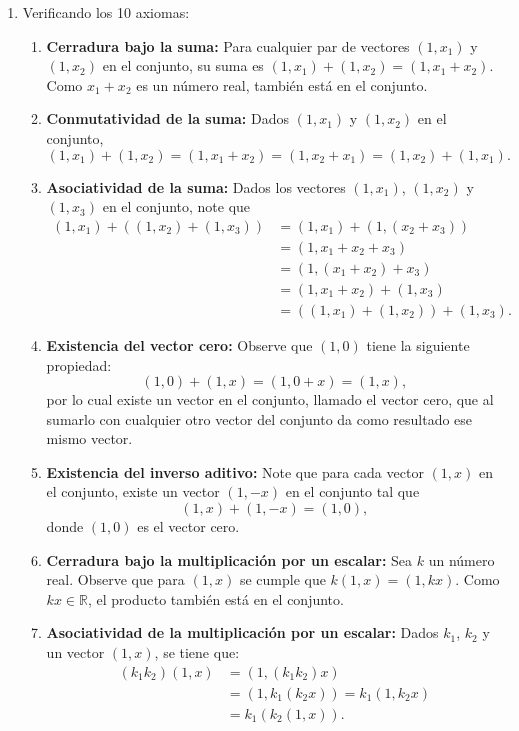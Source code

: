 \begin{example}
\begin{myproof}
\begin{enumerate}[$(a)$]
\item Verificando los 10 axiomas:
\begin{enumerate}[$1.$]
\item \textbf{Cerradura bajo la suma:} Para cualquier par de vectores $(1,x_1)$ y $(1,x_2)$ en el conjunto, su suma es $(1,x_1)+(1,x_2)=(1,x_1+x_2)$. Como $x_1+x_2$ es un número real, también está en el conjunto.

\item \textbf{Conmutatividad de la suma:} Dados $(1,x_1)$ y $(1,x_2)$ en el conjunto, 
$$(1,x_1)+(1,x_2) = (1,x_1+x_2) = (1,x_2+x_1) = (1,x_2)+(1,x_1).$$

\item \textbf{Asociatividad de la suma:} Dados los vectores $(1,x_1)$, $(1,x_2)$ y $(1,x_3)$ en el conjunto, note que
\begin{align*}
(1,x_1)+((1,x_2)+(1,x_3))&= (1,x_1)+(1,(x_2+x_3))\\
&=(1,x_1+x_2+x_3)\\
&=(1,(x_1+x_2)+x_3)\\
&=(1,x_1+x_2)+(1,x_3)\\
&=((1,x_1)+(1,x_2))+(1,x_3).
\end{align*}

\item \textbf{Existencia del vector cero:} Observe que $(1,0)$ tiene la siguiente propiedad: 
$$(1,0)+(1,x)=(1,0+x)=(1,x),$$
por lo cual existe un vector en el conjunto, llamado el vector cero, que al sumarlo con cualquier otro vector del conjunto da como resultado ese mismo vector.

\item \textbf{Existencia del inverso aditivo:} Note que para cada vector $(1,x)$ en el conjunto, existe un vector $(1,-x)$ en el conjunto tal que 
$$(1,x)+(1,-x)=(1,0),$$
donde $(1,0)$ es el vector cero.

\item \textbf{Cerradura bajo la multiplicación por un escalar:} Sea $k$ un número real. Observe que para $(1,x)$ se cumple que $k(1,x)=(1,kx)$. Como $kx\in \mathbb{R}$, el producto también está en el conjunto.

\item \textbf{Asociatividad de la multiplicación por un escalar:} Dados $k_1$, $k_2$ y un vector $(1,x)$, se tiene que: 
\begin{align*}
(k_1k_2)(1,x) &= (1,(k_1k_2)x)\\
&=(1,k_1(k_2x))=k_1(1,k_2x)\\
&=k_1(k_2(1,x)).
\end{align*}


\end{enumerate}
\end{enumerate}
\end{myproof}
\end{example}
